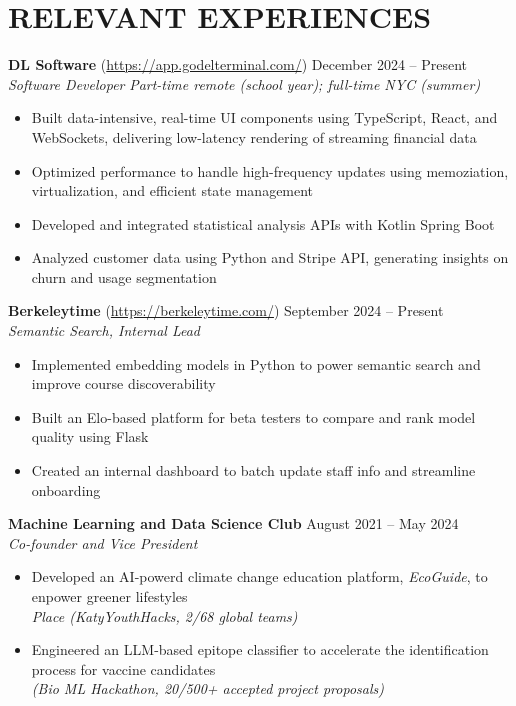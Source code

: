 \section*{RELEVANT EXPERIENCES}

\noindent
\textbf{DL Software} (\href{https://app.godelterminal.com/}{https://app.godelterminal.com/}) \hfill December 2024 -- Present \\
\textit{Software Developer} \hfill \textit{Part-time remote (school year); full-time NYC (summer)}
\begin{itemize}
	\item Built data-intensive, real-time UI components using TypeScript, React, and WebSockets, delivering low-latency rendering of streaming financial data
	\item Optimized performance to handle high-frequency updates using memoziation, virtualization, and efficient state management
	\item Developed and integrated statistical analysis APIs with Kotlin Spring Boot
	\item Analyzed customer data using Python and Stripe API, generating insights on churn and usage segmentation
\end{itemize}

\noindent
\textbf{Berkeleytime} (\href{https://berkeleytime.com/}{https://berkeleytime.com/}) \hfill September 2024 -- Present \\
\textit{Semantic Search, Internal Lead}
\begin{itemize}
	\item Implemented embedding models in Python to power semantic search and improve course discoverability
	\item Built an Elo-based platform for beta testers to compare and rank model quality using Flask
	\item Created an internal dashboard to batch update staff info and streamline onboarding
\end{itemize}

\noindent
\textbf{Machine Learning and Data Science Club} \hfill August 2021 -- May 2024 \\
\textit{Co-founder and Vice President}
\begin{itemize}
	\item Developed an AI-powerd climate change education platform, \textit{EcoGuide}, to enpower greener lifestyles \\ \textit{ Place (KatyYouthHacks, 2/68 global teams)}
	\item Engineered an LLM-based epitope classifier to accelerate the identification process for vaccine candidates \\ \textit{(Bio ML Hackathon, 20/500+ accepted project proposals)}
\end{itemize}

